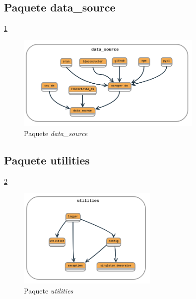 \subsection{Paquete data\_source} \ref{fig:data_source}

\begin{figure}[h!]
    \centering
    \includegraphics[width=0.8\textwidth]{img/anexos/data_source.png}
    \caption{Paquete \textit{data\_source}}
    \label{fig:data_source}
\end{figure}

\subsection{Paquete utilities} \ref{fig:utilities_package}

\begin{figure}[h!]
    \centering
    \includegraphics[width=0.6\textwidth]{img/anexos/utilities.png}
    \caption{Paquete \textit{utilities}}
    \label{fig:utilities_package}
\end{figure}